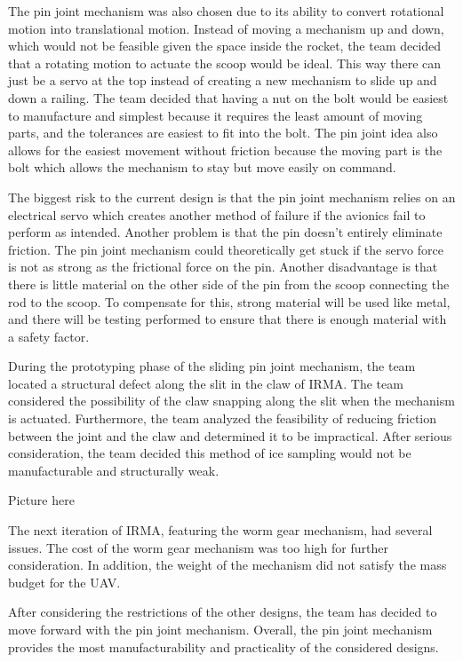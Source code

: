 		The pin joint mechanism was also chosen due to its ability to convert rotational motion into translational motion. Instead of moving a mechanism up and down, which would not be feasible given the space inside the rocket, the team decided that a rotating motion to actuate the scoop would be ideal. This way there can just be a servo at the top instead of creating a new mechanism to slide up and down a railing. The team decided that having a nut on the bolt would be easiest to manufacture and simplest because it requires the least amount of moving parts, and the tolerances are easiest to fit into the bolt. The pin joint idea also allows for the easiest movement without friction because the moving part is the bolt which allows the mechanism to stay but move easily on command.

		The biggest risk to the current design is that the pin joint mechanism relies on an electrical servo which creates another method of failure if the avionics fail to perform as intended. Another problem is that the pin doesn’t entirely eliminate friction. The pin joint mechanism could theoretically get stuck if the servo force is not as strong as the frictional force on the pin. Another disadvantage is that there is little material on the other side of the pin from the scoop connecting the rod to the scoop. To compensate for this, strong material will be used like metal, and there will be testing performed to ensure that there is enough material with a safety factor.

		During the prototyping phase of the sliding pin joint mechanism, the team located a structural defect along the slit in the claw of IRMA. The team considered the possibility of the claw snapping along the slit when the mechanism is actuated. Furthermore, the team analyzed the feasibility of reducing friction between the joint and the claw and determined it to be impractical. After serious consideration, the team decided this method of ice sampling would not be manufacturable and structurally weak.

		Picture here

		The next iteration of IRMA, featuring the worm gear mechanism, had several issues. The cost of the worm gear mechanism was too high for further consideration. In addition, the weight of the mechanism did not satisfy the mass budget for the UAV. 

		After considering the restrictions of the other designs, the team has decided to move forward with the pin joint mechanism. Overall, the pin joint mechanism provides the most manufacturability and practicality of the considered designs. 


